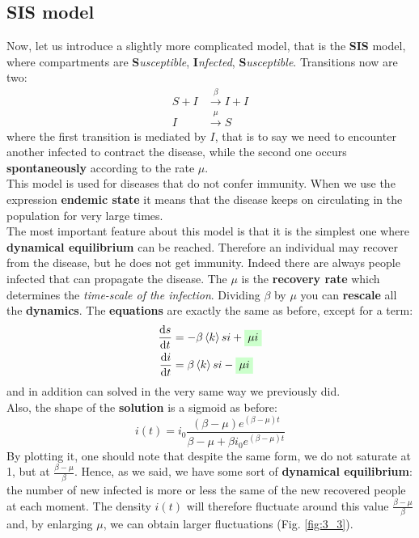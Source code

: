 \documentclass[../main/main.tex]{subfiles}
\begin{document}
\subsection{SIS model}
Now, let us introduce a slightly more complicated model, that is the \textbf{SIS} model, where compartments are \textbf{S}\textit{usceptible}, \textbf{I}\textit{nfected}, \textbf{S}\textit{usceptible}. Transitions now are two:
\begin{equation}
\begin{split}
  S + I &\overset{\beta }{\rightarrow } I + I \\
  I &\overset{\mu }{\rightarrow } S
\end{split}
\end{equation}
where the first transition is mediated by $I$, that is to say we need to encounter another infected to contract the disease, while the second one occurs \textbf{spontaneously} according to the rate $\mu$.\\
This model is used for diseases that do not confer immunity. When we use the expression \textbf{endemic state} it means that the disease keeps on circulating in the population for very large times.\\
The most important feature about this model is that it is the simplest one where \textbf{dynamical equilibrium} can be reached. Therefore an individual may recover from the disease, but he does not get immunity. Indeed there are always people infected that can propagate the disease. The $ \mu  $ is the \textbf{recovery rate} which determines the \textit{time-scale of the infection}. Dividing \( \beta  \) by \( \mu  \) you can \textbf{rescale} all the \textbf{dynamics}.
The \textbf{equations} are exactly the same as before, except for a term:
\begin{equation}
\begin{split}
  \dv{s}{t} &= - \beta \expval{k} si + \mathcolorbox{green!20}{\mu i}  \\
  \dv{i}{t} &= \beta \expval{k} si - \mathcolorbox{green!20}{\mu i}
\end{split}
\end{equation}
and in addition can solved in the very same way we previously did.\\
Also, the shape of the \textbf{solution} is a sigmoid as before:
\begin{equation}
  i(t) = i_0 \frac{(\beta - \mu ) e^{(\beta - \mu )t} }{\beta - \mu  + \beta i_0 e^{(\beta - \mu )t} }
\end{equation}
By plotting it, one should note that despite the same form, we do not saturate at 1, but at $ \frac{\beta - \mu }{\beta } $. Hence, as we said, we have some sort of \textbf{dynamical equilibrium}: the number of new infected is more or less the same of the new recovered people at each moment. The density $i(t)$ will therefore fluctuate around this value $\frac{\beta - \mu }{\beta }$ and, by enlarging \( \mu  \), we can obtain larger fluctuations (Fig. \ref{fig:3_3}).
\end{document}
